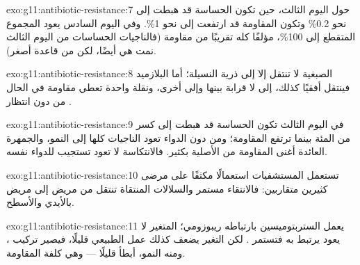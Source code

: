 \begin{solution}{exo:g11:antibiotic-resistance:7}
حول اليوم الثالث، حين تكون  الحساسة قد هبطت إلى نحو 0.2\% وتكون
المقاومة قد ارتفعت إلى نحو 1\%. وفي اليوم السادس يعود المجموع المتقطع
إلى 100\%، مؤلفًا كله تقريبًا من  مقاومة (فالناجيات الحساسات من
اليوم الثالث نمت هي أيضًا، لكن من قاعدة أصغر).
\end{solution}

\begin{solution}{exo:g11:antibiotic-resistance:8}
 الصبغية لا تنتقل إلا إلى ذرية النسيلة؛ أما البلازميد فينتقل
أفقيًا كذلك، إلى  لا قرابة بينها وإلى  أخرى، ونقلة واحدة
تعطي  مقاومة في الحال من دون انتظار .
\end{solution}

\begin{solution}{exo:g11:antibiotic-resistance:9}
في اليوم الثالث تكون  الحساسة قد هبطت إلى كسر من المئة بينما
ترتفع المقاومة؛ ومن دون الدواء تعود الناجيات كلها إلى النمو، والجمهرة
العائدة أغنى  المقاومة من الأصلية بكثير. فالانتكاسة لا تعود
تستجيب للدواء نفسه.
\end{solution}

\begin{solution}{exo:g11:antibiotic-resistance:10}
تستعمل المستشفيات  استعمالًا مكثفًا على مرضى كثيرين
متقاربين: فالانتقاء مستمر والسلالات المنتقاة تنتقل من مريض إلى مريض
بالأيدي والأسطح.
\end{solution}

\begin{solution}{exo:g11:antibiotic-resistance:11}
يعمل الستربتوميسين بارتباطه  ريبوزومي؛  المتغير لا يعود
يرتبط به فتستمر . لكن التغير يضعف كذلك عمل  الطبيعي
قليلًا، فيصير تركيب ، ومنه النمو، أبطأ قليلًا --- وهي كلفة
المقاومة.
\end{solution}

